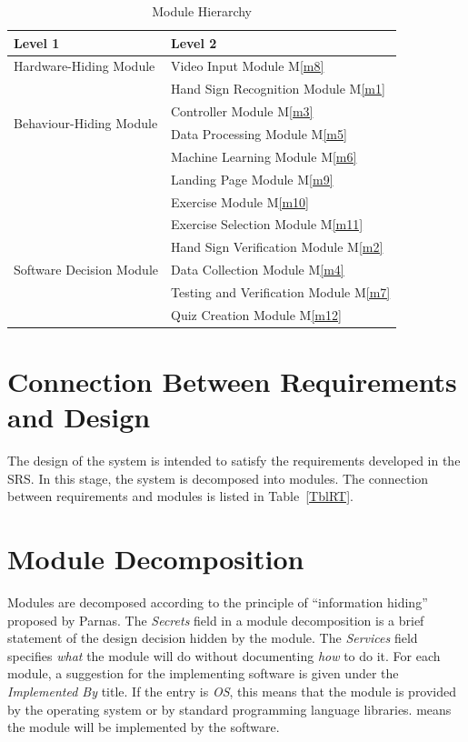 \documentclass[12pt, titlepage]{article}
\newcommand{\mref}[1]{M\ref{#1}}
\begin{document}
\begin{table}[h!]
\centering
\begin{tabular}{p{} p{}}
\toprule
\textbf{Level 1} & \textbf{Level 2}\\
\midrule

\multirow{1}{0.3\textwidth}{Hardware-Hiding Module} 
& Video Input Module \mref{m8}\\
\midrule

\multirow{4}{0.3\textwidth}{Behaviour-Hiding Module} 
& Hand Sign Recognition Module \mref{m1}\\
& Controller Module \mref{m3}\\
& Data Processing Module \mref{m5}\\
& Machine Learning Module \mref{m6}\\
& Landing Page Module \mref{m9}\\
& Exercise Module \mref{m10}\\
& Exercise Selection Module \mref{m11}\\
\midrule

\multirow{3}{0.3\textwidth}{Software Decision Module} 
& Hand Sign Verification Module \mref{m2}\\
& Data Collection Module \mref{m4}\\
& Testing and Verification Module \mref{m7}\\
& Quiz Creation Module \mref{m12} \\
\bottomrule

\end{tabular}
\caption{Module Hierarchy}
\label{TblMH}
\end{table}

\section{Connection Between Requirements and Design} \label{SecConnection}

The design of the system is intended to satisfy the requirements developed in
the SRS. In this stage, the system is decomposed into modules. The connection
between requirements and modules is listed in Table~\ref{TblRT}.

\section{Module Decomposition} \label{SecMD}

Modules are decomposed according to the principle of ``information hiding''
proposed by Parnas. The \emph{Secrets} field in a module
decomposition is a brief statement of the design decision hidden by the
module. The \emph{Services} field specifies \emph{what} the module will do
without documenting \emph{how} to do it. For each module, a suggestion for the
implementing software is given under the \emph{Implemented By} title. If the
entry is \emph{OS}, this means that the module is provided by the operating
system or by standard programming language libraries.  \emph{\progname{}} means the
module will be implemented by the \progname{} software.
\end{document}
